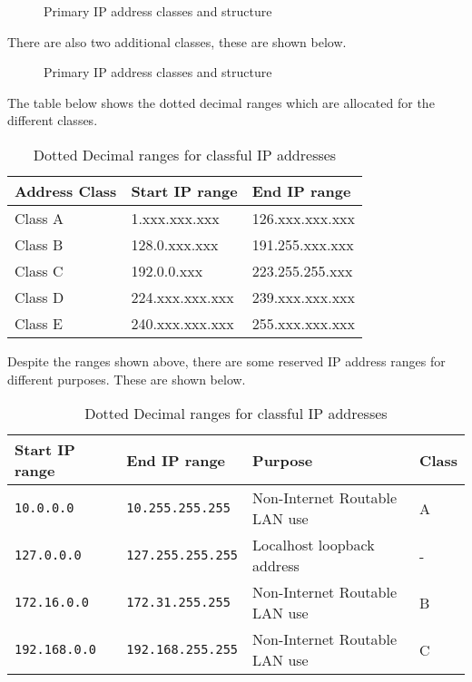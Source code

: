 \begin{figure}[H]
    \centering
    
    \caption{Primary IP address classes and structure}
\end{figure}

There are also two additional classes, these are shown below.

\begin{figure}[H]
    \centering
    
    \caption{Primary IP address classes and structure}
\end{figure}

The table below shows the dotted decimal ranges which are allocated for the different classes.

\begin{table}[H]
    \centering
    {\RaggedRight
    \begin{tabular}{p{} p{} p{}}
    \textbf{Address Class} & \textbf{Start IP range} & \textbf{End IP range}\\
    \hline
    \hline
    Class A & 1.xxx.xxx.xxx & 126.xxx.xxx.xxx\\
    \hline
    Class B & 128.0.xxx.xxx & 191.255.xxx.xxx\\
    \hline
    Class C & 192.0.0.xxx & 223.255.255.xxx\\
    \hline
    Class D & 224.xxx.xxx.xxx & 239.xxx.xxx.xxx\\
    \hline
    Class E & 240.xxx.xxx.xxx & 255.xxx.xxx.xxx\\
    \hline
    \end{tabular}
    }
    \caption{Dotted Decimal ranges for classful IP addresses}
\end{table}

Despite the ranges shown above, there are some reserved IP address ranges for different purposes. These are shown below.
\begin{table}[H]
    \centering
    {\RaggedRight
    \begin{tabular}{p{} p{} p{} p{}}
    \textbf{Start IP range} & \textbf{End IP range} & \textbf{Purpose} & \textbf{Class}\\
    \hline
    \hline
    \verb|10.0.0.0| & \verb|10.255.255.255| & Non-Internet Routable LAN use & A\\
    \hline
    \verb|127.0.0.0| & \verb|127.255.255.255| & Localhost loopback address & -\\
    \hline
    \verb|172.16.0.0| & \verb|172.31.255.255| & Non-Internet Routable LAN use & B\\
    \hline
    \verb|192.168.0.0| & \verb|192.168.255.255| & Non-Internet Routable LAN use & C\\
    \hline
    \end{tabular}
    }
    \caption{Dotted Decimal ranges for classful IP addresses}
\end{table}

